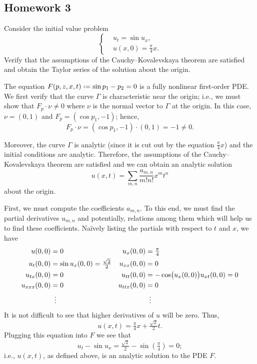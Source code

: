 \subsection{Homework 3}
\begin{problem}
  Consider the initial value problem
  \[
    \left\{
      \begin{aligned}
        &u_t=\sin u_x,\\
        &u(x,0)=\tfrac{\pi}{4}x.
      \end{aligned}
    \right.
  \]
  Verify that the assumptions of the Cauchy--Kovalevskaya theorem are
  satisfied and obtain the Taylor series of the solution about the origin.
\end{problem}
\begin{solution*}
  The equation \(F(p,z,x,t)\defeq\sin p_1-p_2=0\) is a fully nonlinear
  first-order PDE. We first verify that the curve \(\Gamma\) is
  characteristic near the origin; i.e., we must show that \(F_p\cdot\nu\neq
  0\) where \(\nu\) is the normal vector to \(\Gamma\) at the origin. In
  this case, \(\nu=(0,1)\) and \(F_p=(\cos p_1,-1)\); hence,
  \[
    F_p\cdot\nu= (\cos p_1,-1)\cdot(0,1)=-1\neq 0.
  \]

  Moreover, the curve \(\Gamma\) is analytic (since it is cut out by the
  equation \(\frac{\pi}{4}x\)) and the initial conditions are
  analytic. Therefore, the assumptions of the Cauchy--Kovalevskaya theorem
  are satisfied and we can obtain an analytic solution
  \[
    u(x,t)=\sum_{m,n}\frac{a_{m,n}}{m!n!}x^mt^n
  \]
  about the origin.

  First, we must compute the coefficients \(a_{m,n}\). To this end, we must
  find the partial derivatives \(u_{m,n}\) and potentially, relations among
  them which will help us to find these coefficients. Naïvely listing the
  partials with respect to \(t\) and \(x\), we have
  \begin{align*}
    u(0,0)&=0&
    u_x(0,0)&=\tfrac{\pi}{4}\\
    u_t(0,0)&=\sin u_x(0,0)=\tfrac{\sqrt{2}}{2}&
    u_{xx}(0,0)&=0\\
    u_{tx}(0,0)&=0&
    u_{tt}(0,0)&=-\cos\bigl(u_x(0,0)\bigr)u_{xt}(0,0)=0\\
    u_{xxx}(0,0)&=0&
    u_{ttx}(0,0)&=0\\
    &\vdotswithin{=}&&\vdotswithin{=}
  \end{align*}
  It is not difficult to see that higher derivatives of \(u\) will be
  zero. Thus,
  \[
    u(x,t)=\tfrac{\pi}{4}x+\tfrac{\sqrt{2}}{2}t.
  \]
  Plugging this equation into \(F\) we see that
  \[
    u_t-\sin u_x=\tfrac{\sqrt{2}}{2}-\sin(\tfrac{\pi}{4})=0;
  \]
  i.e., \(u(x,t)\), as defined above, is an analytic solution to the PDE
  \(F\).
\end{solution*}


